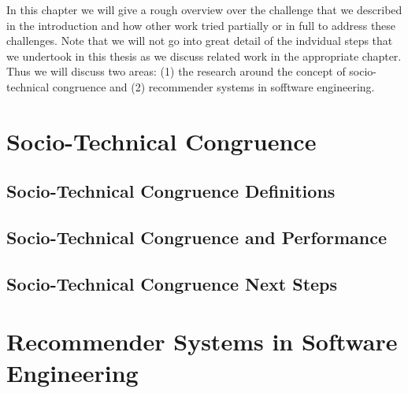 In this chapter we will give a rough overview over the challenge that we described in the introduction and how other work tried partially or in full to address these challenges.
Note that we will not go into great detail of the indvidual steps that we undertook in this thesis as we discuss related work in the appropriate chapter.
Thus we will discuss two areas: (1) the research around the concept of socio-technical congruence and (2) recommender systems in sofftware engineering.

\section{Socio-Technical Congruence}
\subsection{Socio-Technical Congruence Definitions}
\subsection{Socio-Technical Congruence and Performance}
\subsection{Socio-Technical Congruence Next Steps}

\section{Recommender Systems in Software Engineering}
